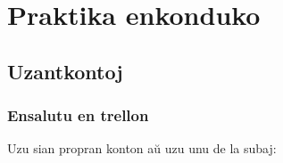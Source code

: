  
\section{Praktika enkonduko}
\subsection{Uzantkontoj}
  \begin{frame}
    \frametitle{Ensalutu en trellon}

	Uzu sian propran konton aŭ uzu unu de la subaj:


\end{frame}

